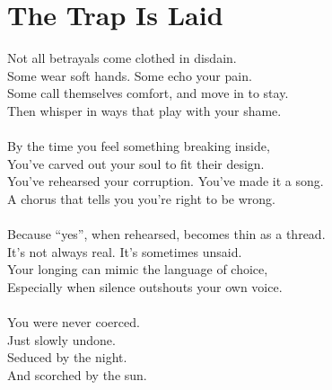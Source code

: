 \part{The Trap Is Laid}

\vfill

\begin{flushright}
  \Large
  Not all betrayals come clothed in disdain.\\
  Some wear soft hands. Some echo your pain.\\
  Some call themselves comfort, and move in to stay.\\
  Then whisper in ways that play with your shame.\\
  \ \\
  By the time you feel something breaking inside,\\
  You’ve carved out your soul to fit their design.\\
  You’ve rehearsed your corruption. You’ve made it a song.\\
  A chorus that tells you you’re right to be wrong.\\
  \ \\
  Because ``yes'', when rehearsed, becomes thin as a thread.\\
  It’s not always real. It’s sometimes unsaid.\\
  Your longing can mimic the language of choice,\\
  Especially when silence outshouts your own voice.\\
  \ \\
  You were never coerced.\\
  Just slowly undone.\\
  Seduced by the night.\\
  And scorched by the sun.\\
  \end{flushright}


